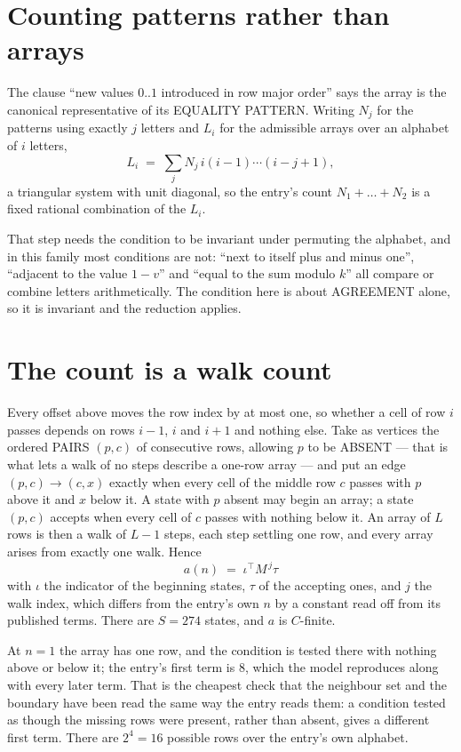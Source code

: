 \documentclass[11pt,a4paper]{article}
\theoremstyle{plain}
\theoremstyle{definition}
\begin{document}
\section{Counting patterns rather than arrays}

The clause ``new values $0..1$ introduced in row major order'' says the array is the
canonical representative of its EQUALITY PATTERN. Writing $N_j$ for the patterns using exactly
$j$ letters and $L_i$ for the admissible arrays over an alphabet of $i$ letters,
\[
L_i\;=\;\sum_j N_j\,i(i-1)\cdots(i-j+1),
\]
a triangular system with unit diagonal, so the entry's count $N_1+\dots+N_{2}$ is a
fixed rational combination of the $L_i$.

That step needs the condition to be invariant under permuting the alphabet, and in this family
most conditions are not: ``next to itself plus and minus one'', ``adjacent to the value
$1-v$'' and ``equal to the sum modulo $k$'' all compare or combine letters arithmetically.
The condition here is about AGREEMENT alone, so it is invariant and the reduction applies.

\section{The count is a walk count}

Every offset above moves the row index by at most one, so whether a cell of row $i$ passes
depends on rows $i-1$, $i$ and $i+1$ and nothing else. Take as vertices the ordered PAIRS
$(p,c)$ of consecutive rows, allowing $p$ to be ABSENT --- that is what lets a walk of no steps
describe a one-row array --- and put an edge $(p,c)\to(c,x)$ exactly when every cell of the
middle row $c$ passes with $p$ above it and $x$ below it. A state with $p$ absent may begin an
array; a state $(p,c)$ accepts when every cell of $c$ passes with nothing below it. An array of
$L$ rows is then a walk of $L-1$ steps, each step settling one row, and every array arises from
exactly one walk. Hence
\[
a(n)\;=\;\iota^{\!\top}M^{\,j}\tau
\]
with $\iota$ the indicator of the beginning states, $\tau$ of the accepting ones, and $j$ the
walk index, which differs from the entry's own $n$ by a constant read off from its published
terms. There are $S=274$ states, and $a$ is $C$-finite.

At $n=1$ the array has one row, and
the condition is tested there with nothing above or below it; the entry's first term is
$8$, which the model reproduces along with every later term. That is the cheapest check
that the neighbour set and the boundary have been read the same way the entry reads them: a
condition tested as though the missing rows were present, rather than absent, gives a different
first term. There are $2^{4}=16$ possible rows over the entry's own alphabet.
\end{document}
